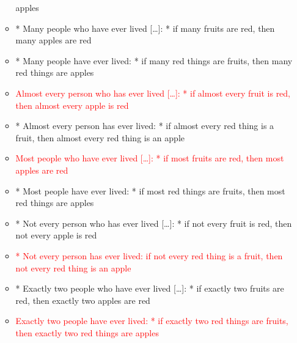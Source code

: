 \documentclass[a4paper]{article}
\begin{document}
\begin{itemize}
\begin{itemize}
    apples
  \item * Many people who have ever lived [\ldots]: * if many fruits are red, then many apples are red
  \item * Many people have ever lived: * if many red things are fruits, then many red things are
    apples
  \item \textcolor{red}{Almost every person who has ever lived [\ldots]: * if almost every fruit is red, then
      almost every apple is red}
  \item * Almost every person has ever lived: * if almost every red thing is a fruit, then almost
    every red thing is an apple
  \item \textcolor{red}{Most people who have ever lived [\ldots]: * if most fruits are red, then most apples are red}
  \item * Most people have ever lived: * if most red things are fruits, then most red things are
    apples
  \item * Not every person who has ever lived [\ldots]: * if not every fruit is red, then not every apple is red
  \item \textcolor{red}{* Not every person has ever lived: if not every red thing is a fruit, then not every
      red thing is an apple}
  \item * Exactly two people who have ever lived [\ldots]: * if exactly two fruits are red, then exactly two
    apples are red
  \item \textcolor{red}{Exactly two people have ever lived: * if exactly two red things are fruits, then exactly two red
    things are apples}
  \end{itemize}
\end{itemize}
\end{document}
